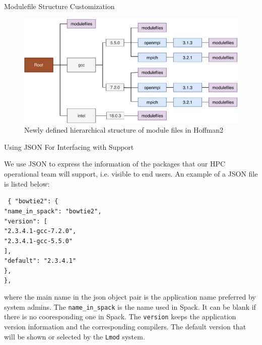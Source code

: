 \documentclass[final]{beamer}
\newlength{\onecolwid}
\begin{document}
\begin{frame}[t]
\begin{columns}[t]
\begin{column}{\onecolwid}
\begin{block}{Modulefile Structure Customization}
\vspace{0.75em}
\begin{figure}[htbp]
  \centerline{\includegraphics[width=0.9\linewidth]{figures/h2_new_hier}}
  \caption{Newly defined hierarchical structure of module files in Hoffman2}
  \label{fig:h2_new_hier}
\end{figure}


\end{block}



\vspace{-1em}
\begin{block}{Using JSON For Interfacing with Support}

We use JSON to express the information of the packages that our HPC operational team will support, i.e. visible to end users. An example of a JSON file is listed below:

\texttt{
\{  "bowtie2": \{ \\
\qquad \qquad         "name\_in\_spack": "bowtie2", \\
\qquad \qquad         "version": [ \\
\qquad \qquad \qquad             "2.3.4.1-gcc-7.2.0",\\
\qquad \qquad \qquad             "2.3.4.1-gcc-5.5.0" \\
\qquad \qquad         ], \\
\qquad \qquad         "default": "2.3.4.1" \\
\qquad     \}, \\
\}, \\
}

where the main name in the json object pair is the application name preferred by system admins. The \texttt{name\_in\_spack} is the name used in Spack. It can be blank if there is no cooresponding one in Spack. The \texttt{version} keeps the application version information and the corresponding compilers. The default version that will be shown or selected by the \texttt{Lmod} system\cite{mclay:11}.


\end{block}
\end{column}
\end{columns}
\end{frame}
\end{document}
